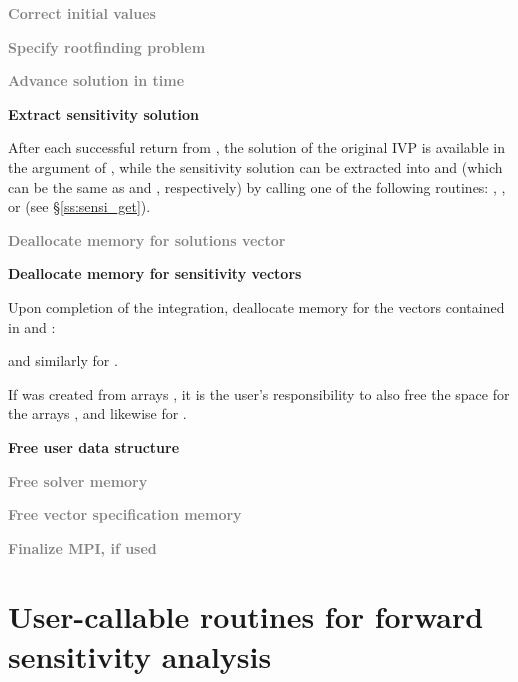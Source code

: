 \begin{Steps}
\item
  \textcolor{gray}{\bf Correct initial values}

\item
  \textcolor{gray}{\bf Specify rootfinding problem}

\item
  \textcolor{gray}{\bf Advance solution in time}

\item
  {\bf Extract sensitivity solution}

  After each successful return from , the solution of the
  original IVP is available in the  argument of ,
  while the sensitivity solution can be extracted into  and 
  (which can be the same as  and , respectively) by calling 
  one of the following routines: , , 
   or  (see \S\ref{ss:sensi_get}).

\item
  \textcolor{gray}{\bf Deallocate memory for solutions vector}

\item 
  {\bf Deallocate memory for sensitivity vectors}

  Upon completion of the integration, deallocate memory for the vectors contained
  in  and :


  and similarly for .

  If  was created from  arrays , it is the
  user's responsibility to also free the space for the arrays ,
  and likewise for .

\item
  {\bf Free user data structure}

\item
  \textcolor{gray}{\bf Free solver memory}
  
\item
  \textcolor{gray}{\bf Free vector specification memory}

\item 
  \textcolor{gray}{\bf Finalize MPI, if used}
  
\end{Steps}


\section{User-callable routines for forward sensitivity analysis}

